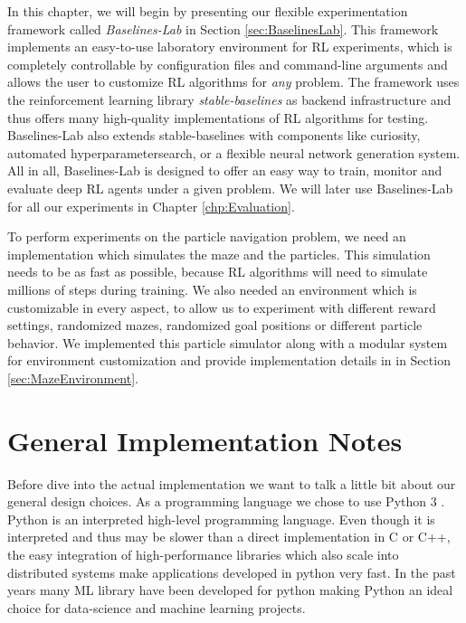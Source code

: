 In this chapter, we will begin by presenting our flexible experimentation framework called \textit{Baselines-Lab} in Section \ref{sec:BaselinesLab}. This framework implements an easy-to-use laboratory environment for RL experiments, which is completely controllable by configuration files and command-line arguments and allows the user to customize RL algorithms for \textit{any} problem. The framework uses the reinforcement learning library \textit{stable-baselines} \cite{stable-baselines} as backend infrastructure and thus offers many high-quality implementations of RL algorithms for testing. Baselines-Lab also extends stable-baselines with components like curiosity, automated hyperparametersearch, or a flexible neural network generation system. All in all, Baselines-Lab is designed to offer an easy way to train, monitor and evaluate deep RL agents under a given problem. We will later use Baselines-Lab for all our experiments in Chapter \ref{chp:Evaluation}. 

To perform experiments on the particle navigation problem, we need an implementation which simulates the maze and the particles. This simulation needs to be as fast as possible, because RL algorithms will need to simulate millions of steps during training. We also needed an environment which is customizable in every aspect, to allow us to experiment with different reward settings, randomized mazes, randomized goal positions or different particle behavior. We implemented this particle simulator along with a modular system for environment customization and provide implementation details in in Section \ref{sec:MazeEnvironment}. 

\section{General Implementation Notes} \label{sec:ImplementationNotes}
Before dive into the actual implementation we want to talk a little bit about our general design choices. As a programming language we chose to use Python 3 \cite{van2011python, pythonWebsite}. Python is an interpreted high-level programming language. Even though it is interpreted and thus may be slower than a direct implementation in C or C++, the easy integration of high-performance libraries which also scale into distributed systems make applications developed in python very fast. In the past years many ML library have been developed for python making Python an ideal choice for data-science and machine learning projects.

